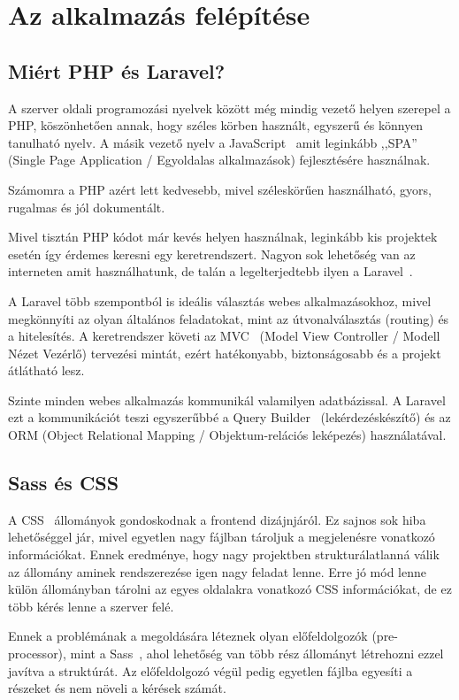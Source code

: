\documentclass[
]{thesis-ekf}
\theoremstyle{definition}
\theoremstyle{remark}
\begin{document}
	\chapter{Az alkalmazás felépítése}
	\section{Miért PHP és Laravel?}
	A szerver oldali programozási nyelvek között még mindig vezető helyen szerepel a PHP, köszönhetően annak, hogy széles körben használt, egyszerű és könnyen tanulható nyelv. A másik vezető nyelv a JavaScript~\cite{js_book} amit leginkább ,,SPA'' (Single Page Application / Egyoldalas alkalmazások) fejlesztésére használnak. 
	
	Számomra a PHP azért lett kedvesebb, mivel széleskörűen használható, gyors, rugalmas és jól dokumentált. 
	
	Mivel tisztán PHP kódot már kevés helyen használnak, leginkább kis projektek esetén így érdemes keresni egy keretrendszert. Nagyon sok lehetőség van az interneten amit használhatunk, de talán a legelterjedtebb ilyen a Laravel~\cite{laravel_book}. 
	
	A Laravel több szempontból is ideális választás webes alkalmazásokhoz, mivel megkönnyíti az olyan általános feladatokat, mint az útvonalválasztás (routing) és a hitelesítés. A keretrendszer követi az MVC~\cite{mvc_pattern} (Model View Controller / Modell Nézet Vezérlő) tervezési mintát, ezért hatékonyabb, biztonságosabb és a projekt átlátható lesz. 
	
	Szinte minden webes alkalmazás kommunikál valamilyen adatbázissal. A Laravel ezt a kommunikációt teszi egyszerűbbé a Query Builder~\cite{laravel_querybuilder} (lekérdezéskészítő) és az ORM (Object Relational Mapping / Objektum-relációs leképezés) használatával. 
	
	\section{Sass és CSS}
	A CSS~\cite{css_doc} állományok gondoskodnak a frontend dizájnjáról. Ez sajnos sok hiba lehetőséggel jár, mivel egyetlen nagy fájlban tároljuk a megjelenésre vonatkozó információkat. Ennek eredménye, hogy nagy projektben strukturálatlanná válik az állomány aminek rendszerezése igen nagy feladat lenne. Erre jó mód lenne külön állományban tárolni az egyes oldalakra vonatkozó CSS információkat, de ez több kérés lenne a szerver felé. 
	
	Ennek a problémának a megoldására léteznek olyan előfeldolgozók (pre-processor), mint a Sass~\cite{sass_doc}, ahol lehetőség van több rész állományt létrehozni ezzel javítva a struktúrát. Az előfeldolgozó végül pedig egyetlen fájlba egyesíti a részeket és nem növeli a kérések számát. 
	
\end{document}
